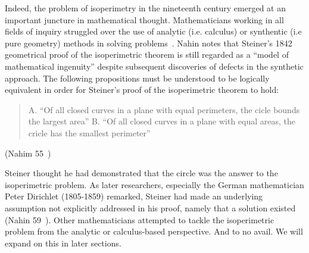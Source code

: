 \documentclass[a4paper]{book}
\numberwithin{theorem}{section}%
\begin{document}
Indeed, the problem of isoperimetry in the nineteenth century emerged at an important juncture in mathematical thought. Mathematicians working in all fields of inquiry struggled over the use of analytic (i.e. calculus) or synthentic (i.e pure geometry) methods in solving problems~\citep{wiegert2010sagacity}. Nahin notes that Steiner's 1842 geometrical proof of the isoperimetric theorem is still regarded as a ``model of mathematical ingenuity'' despite subsequent discoveries of defects in the synthetic approach. The following propositions must be understood to be logically equivalent in order for Steiner's proof of the isoperimetric theorem to hold:
\begin{center}
    \begin{quote}
        A. ``Of all closed curves in a plane with equal perimeters, the cicle bounds the largest area''
        \newline
        [and]
        \newline
        B. ``Of all closed curves in a plane with equal areas, the cricle has the smallest perimeter''
    \end{quote}
    (Nahim 55~\citep{nahin2021least})
\end{center}

Steiner thought he had demonstrated that the circle was the answer to the isoperimetric problem. As later researchers, especially the German mathematician Peter Dirichlet (1805-1859) remarked, Steiner had made an underlying assumption not explicitly addressed in his proof, namely that a solution existed (Nahin 59~\citep{nahin2021least}).
\newline
\newline
Other mathematicians attempted to tackle the isoperimetric problem from the analytic or calculus-based perspective. And to no avail. We will expand on this in later sections.
\end{document}
